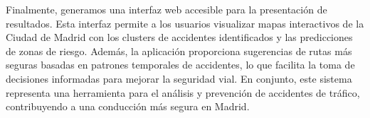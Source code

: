Finalmente, generamos una interfaz web accesible para la presentación de resultados. Esta interfaz permite a los usuarios visualizar mapas interactivos de la Ciudad de Madrid con los clusters de accidentes identificados y las predicciones de zonas de riesgo. Además, la aplicación proporciona sugerencias de rutas más seguras basadas en patrones temporales de accidentes, lo que facilita la toma de decisiones informadas para mejorar la seguridad vial. En conjunto, este sistema representa una herramienta para el análisis y prevención de accidentes de tráfico, contribuyendo a una conducción más segura en Madrid.





